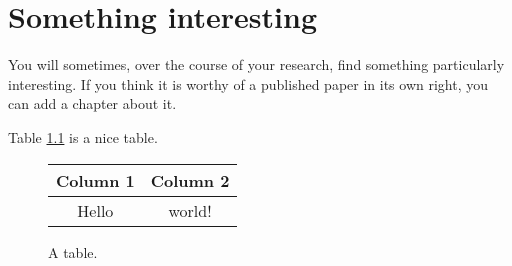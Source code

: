 \chapter{Something interesting}
You will sometimes, over the course of your research, find something
particularly interesting. If you think it is worthy of a published paper in
its own right, you can add a chapter about it.

\lipsum[25]

Table \ref{table:mytable} is a nice table.

\lipsum[30]

\begin{figure}[h]
  \centering
  \begin{tabular}{cc}
    \toprule
    Column 1 & Column 2 \\
    \midrule
    Hello & world! \\
    \bottomrule
  \end{tabular}
  \caption{A table.}
  \label{table:mytable}
\end{figure}


\lipsum[20-25]